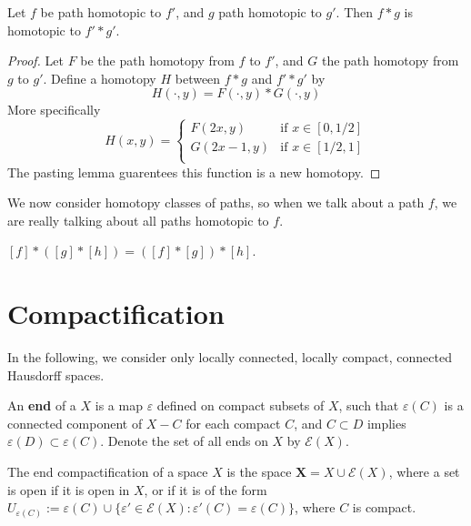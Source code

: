 \begin{example}
\begin{theorem}
    Let $f$ be path homotopic to $f'$, and $g$ path homotopic to $g'$. Then $f * g$ is homotopic to $f' * g'$.
\end{theorem}
\begin{proof}
    Let $F$ be the path homotopy from $f$ to $f'$, and $G$ the path homotopy from $g$ to $g'$. Define a homotopy $H$ between $f * g$ and $f' * g'$ by
    \[ H(\cdot,y) = F(\cdot, y) * G(\cdot, y) \]
    More specifically
    \[ H(x,y) = \begin{cases}
        F(2x,y) & \text{if } x \in [0,1/2]\\
        G(2x - 1,y) & \text{if } x \in [1/2,1]\\
\end{cases} \]
    The pasting lemma guarentees this function is a new homotopy.
\end{proof}

We now consider homotopy classes of paths, so when we talk about a path $f$, we are really talking about all paths homotopic to $f$.

\begin{theorem}
    $[f] * ([g] * [h]) = ([f] * [g]) * [h]$.
\end{theorem}

\chapter{Compactification}

In the following, we consider only locally connected, locally compact, connected Hausdorff spaces.

\begin{definition}
    An {\bf end} of a $X$ is a map $\varepsilon$ defined on compact subsets of $X$, such that $\varepsilon(C)$ is a connected component of $X - C$ for each compact $C$, and $C \subset D$ implies $\varepsilon(D) \subset \varepsilon(C)$. Denote the set of all ends on $X$ by $\mathcal{E}(X)$.
\end{definition}

\begin{definition}
    The end compactification of a space $X$ is the space $\mathbf{X} = X \cup \mathcal{E}(X)$, where a set is open if it is open in $X$, or if it is of the form $U_{\varepsilon(C)} := \varepsilon(C) \cup \{ \varepsilon' \in \mathcal{E}(X) : \varepsilon'(C) = \varepsilon(C) \}$, where $C$ is compact.
\end{definition}


\end{example}
